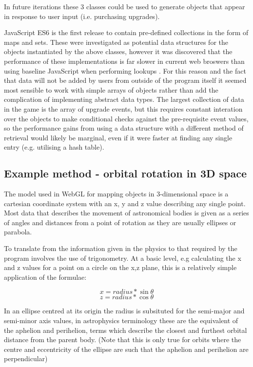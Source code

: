 \documentclass[twoside]{bhamthesis}
\begin{document}
In future iterations these 3 classes could be used to generate objects that appear in response to user input (i.e. purchasing upgrades).

JavaScript ES6 is the first release to contain pre-defined collections in the form of maps and sets. These were investigated as potential data structures for the objects instantiated by the above classes, however it was discovered that the performance of these implementations is far slower in current web broswers than using baseline JavaScript when performing lookups \cite{decker_six_2017}. For this reason and the fact that data will not be added by users from outside of the program itself it seemed most sensible to work with simple arrays of objects rather than add the complication of implementing abstract data types. The largest collection of data in the game is the array of upgrade events, but this requires constant interation over the objects to make conditional checks against the pre-requisite event values, so the performance gains from using a data structure with a different method of retrieval would likely be marginal, even if it were faster at finding any single entry (e.g. utilising a hash table).

\subsection{Example method - orbital rotation in 3D space}
The model used in WebGL for mapping objects in 3-dimensional space is a cartesian coordinate system with an x, y and z value describing any single point. Most data that describes the movement of astronomical bodies is given as a series of angles and distances from a point of rotation as they are usually ellipses or parabola.

To translate from the information given in the physics to that required by the program involves the use of trigonometry. At a basic level, e.g calculating the x and z values for a point on a circle on the x,z plane, this is a relatively simple application of the formulae:

\[x = radius*\sin\theta\]
\[z = radius*\cos\theta\]

In an ellipse centred at its origin the radius is subsituted for the semi-major and semi-minor axis values, in astrophysics terminology these are the equivalent of the aphelion and perihelion, terms which describe the closest and furthest orbital distance from the parent body. (Note that this is only true for orbits where the centre and eccentricity of the ellipse are such that the aphelion and perihelion are perpendicular)
\end{document}

